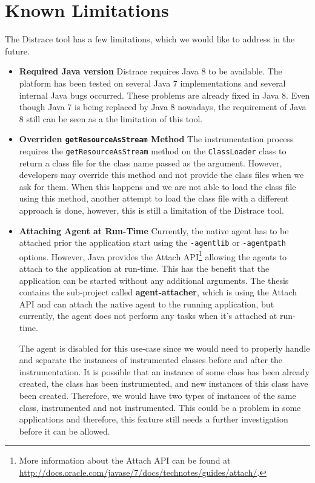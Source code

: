 \section{Known Limitations}
The Distrace tool has a few limitations, which we would like to address in the future.
\begin{itemize}
	\item \textbf{Required Java version} \newline
	Distrace requires Java 8 to be available. The platform has been tested on several Java 7 implementations and several internal Java bugs occurred. These problems are already fixed in Java 8. Even though Java 7 is being replaced by Java 8 nowadays, the requirement of Java 8 still can be seen as a the limitation of this tool.
	\item \textbf{Overriden \texttt{getResourceAsStream} Method} \newline
	The instrumentation process requires the \texttt{getResourceAsStream} method on the \texttt{ClassLoader} class to return a class file for the class name passed as the argument. However, developers may override this method and not provide the class files when we ask for them. When this happens and we are not able to load the class file using this method, another attempt to load the class file with a different approach is done, however, this is still a limitation of the Distrace tool.
	
	\item \textbf{Attaching Agent at Run-Time} \newline
	Currently, the native agent has to be attached prior the application start using the \texttt{-agentlib} or \texttt{-agentpath} options. However, Java provides the Attach API\footnote{More information about the Attach API can be found at \url{http://docs.oracle.com/javase/7/docs/technotes/guides/attach/}.} allowing the agents to attach to the application at run-time. This has the benefit that the application can be started without any additional arguments. The thesis contains the sub-project called \textbf{agent-attacher}, which is using the Attach API and can attach the native agent to the running application, but currently, the agent does not perform any tasks when it's attached at run-time.
	
	The agent is disabled for this use-case since we would need to properly handle and separate the instances of instrumented classes before and after the instrumentation. It is possible that an instance of some class has been already created, the class has been instrumented, and new instances of this class have been created. Therefore, we would have two types of instances of the same class, instrumented and not instrumented. This could be a problem in some applications and therefore, this feature still needs a further investigation before it can be allowed.
\end{itemize}




